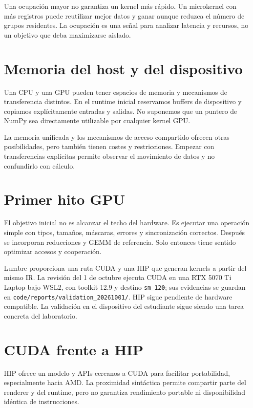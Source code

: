 \documentclass[12pt,a4paper,oneside]{report}
\begin{document}
Una ocupación mayor no garantiza un kernel más rápido. Un microkernel con más registros puede reutilizar mejor datos y ganar aunque reduzca el número de grupos residentes. La ocupación es una señal para analizar latencia y recursos, no un objetivo que deba maximizarse aislado.

\section{Memoria del host y del dispositivo}
Una CPU y una GPU pueden tener espacios de memoria y mecanismos de transferencia distintos. En el runtime inicial reservamos buffers de dispositivo y copiamos explícitamente entradas y salidas. No suponemos que un puntero de NumPy sea directamente utilizable por cualquier kernel GPU.

La memoria unificada y los mecanismos de acceso compartido ofrecen otras posibilidades, pero también tienen costes y restricciones. Empezar con transferencias explícitas permite observar el movimiento de datos y no confundirlo con cálculo.

\section{Primer hito GPU}
El objetivo inicial no es alcanzar el techo del hardware. Es ejecutar una operación simple con tipos, tamaños, máscaras, errores y sincronización correctos. Después se incorporan reducciones y GEMM de referencia. Solo entonces tiene sentido optimizar accesos y cooperación.

Lumbre proporciona una ruta CUDA y una HIP que generan kernels a partir del mismo IR. La revisión del 1 de octubre ejecuta CUDA en una RTX 5070 Ti Laptop bajo WSL2, con toolkit 12.9 y destino \texttt{sm\_120}; sus evidencias se guardan en \texttt{code/reports\allowbreak{}/validation\_\allowbreak{}20261001/}. HIP sigue pendiente de hardware compatible. La validación en el dispositivo del estudiante sigue siendo una tarea concreta del laboratorio.

\section{CUDA frente a HIP}
HIP ofrece un modelo y APIs cercanos a CUDA para facilitar portabilidad, especialmente hacia AMD. La proximidad sintáctica permite compartir parte del renderer y del runtime, pero no garantiza rendimiento portable ni disponibilidad idéntica de instrucciones. \cite{hip}
\end{document}
